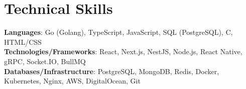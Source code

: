 \documentclass[letterpaper,11pt]{article}
\begin{document}
\section{Technical Skills}
 \begin{itemize}[leftmargin=0.15in, label={}]
    \small{\item{
     \textbf{Languages}{: Go (Golang), TypeScript, JavaScript, SQL (PostgreSQL), C, HTML/CSS} \\
     \textbf{Technologies/Frameworks}{: React, Next.js, NestJS, Node.js, React Native, gRPC, Socket.IO, BullMQ} \\
     \textbf{Databases/Infrastructure}{: PostgreSQL, MongoDB, Redis, Docker, Kubernetes, Nginx, AWS, DigitalOcean, Git}
    }}
 \end{itemize}
 \vspace{-16pt}
\end{document}
